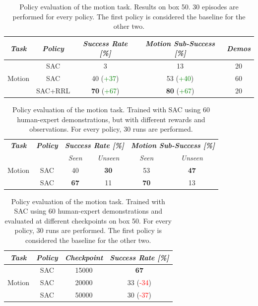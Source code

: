 \documentclass[letterpaper, 10 pt, conference]{ieeeconf}  %
\begin{document}
\begin{table}[t]
    \centering
    \scriptsize
    \caption{Policy evaluation of the motion task. Results on box 50. 30 episodes are performed for every policy. The first policy is considered the baseline for the other two.}
    \renewcommand{\arraystretch}{1.5}
    \begin{tabular}{c|c|c|c|c}
        \toprule \textit{\textbf{Task}} & \textit{\textbf{Policy}} & \textit{\textbf{Success Rate [\%]}} & \textit{\textbf{Motion Sub-Success [\%]}} & \textit{\textbf{Demos}}\\
        \midrule & SAC & 3 & 13 & 20 \\
        Motion & SAC & 40 (\textcolor{green}{+37}) & 53 (\textcolor{green}{+40}) & 60 \\
         & SAC+RRL & \textbf{70} (\textcolor{green}{+67}) & \textbf{80} (\textcolor{green}{+67}) & 20 \\
        \bottomrule
    \end{tabular}
    \label{motion_sac_comparison}
\end{table}
\begin{table}[t]
    \centering
    \caption{Policy evaluation of the motion task. Trained with SAC using 60 human-expert demonstrations, but with different rewards and observations. For every policy, 30 runs are performed.}
    \renewcommand{\arraystretch}{1.5}
    \begin{tabular}{c|c|cc|cc}
        \toprule \textit{\textbf{Task}} & \textit{\textbf{Policy}} & \multicolumn{2}{c|}{\textit{\textbf{Success Rate [\%]}}} & \multicolumn{2}{c}{\textit{\textbf{Motion Sub-Success [\%]}}}\\
        & & \textit{Seen} & \textit{Unseen} & \textit{Seen} & \textit{Unseen}\\
        \midrule Motion & SAC & 40 & \textbf{30} & 53 & \textbf{47} \\
         & SAC & \textbf{67} & 11 & \textbf{70} & 13 \\
        \bottomrule
    \end{tabular}
    \label{sac_60demos_comparision}
\end{table}
\begin{table}[t]
    \centering
    \caption{Policy evaluation of the motion task. Trained with SAC using 60 human-expert demonstrations and evaluated at different checkpoints on box 50. For every policy, 30 runs are performed. The first policy is considered the baseline for the other two.}
    \renewcommand{\arraystretch}{1.5}
    \begin{tabular}{c|c|c|c}
        \toprule \textit{\textbf{Task}} & \textit{\textbf{Policy}} & \textit{\textbf{Checkpoint}} & \textit{\textbf{Success Rate [\%]}}\\
        \midrule  & SAC & 15000 & \textbf{67}\\
        Motion & SAC & 20000 & 33 (\textcolor{red}{-34})\\
        & SAC & 50000 & 30 (\textcolor{red}{-37})\\
        \bottomrule
    \end{tabular}
    \label{sac_rrl_comparision}
\end{table}
\end{document}
